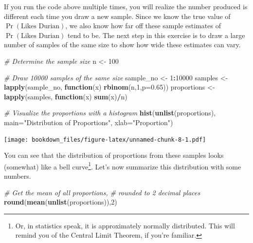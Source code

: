 \documentclass[openany]{book}
\newenvironment{Shaded}{\begin{snugshade}}{\end{snugshade}}
\newcommand{\KeywordTok}[1]{\textcolor[rgb]{0.13,0.29,0.53}{\textbf{#1}}}
\newcommand{\DataTypeTok}[1]{\textcolor[rgb]{0.13,0.29,0.53}{#1}}
\newcommand{\DecValTok}[1]{\textcolor[rgb]{0.00,0.00,0.81}{#1}}
\newcommand{\FloatTok}[1]{\textcolor[rgb]{0.00,0.00,0.81}{#1}}
\newcommand{\StringTok}[1]{\textcolor[rgb]{0.31,0.60,0.02}{#1}}
\newcommand{\CommentTok}[1]{\textcolor[rgb]{0.56,0.35,0.01}{\textit{#1}}}
\newcommand{\ControlFlowTok}[1]{\textcolor[rgb]{0.13,0.29,0.53}{\textbf{#1}}}
\newcommand{\OperatorTok}[1]{\textcolor[rgb]{0.81,0.36,0.00}{\textbf{#1}}}
\newcommand{\NormalTok}[1]{#1}
\let\rmarkdownfootnote\footnote%
\def\footnote{\protect\rmarkdownfootnote}
\begin{document}
If you run the code above multiple times, you will realize the number
produced is different each time you draw a new sample. Since we know the
true value of \(\Pr(\text{Likes Durian})\), we also know how far off
these sample estimates of \(\Pr(\text{Likes Durian})\) tend to be. The
next step in this exercise is to draw a large number of samples of the
same size to show how wide these estimates can vary.

\begin{Shaded}
\begin{Highlighting}[]
\CommentTok{# Determine the sample size}
\NormalTok{n <-}\StringTok{ }\DecValTok{100}

\CommentTok{# Draw 10000 samples of the same size}
\NormalTok{sample_no <-}\StringTok{ }\DecValTok{1}\OperatorTok{:}\DecValTok{10000}
\NormalTok{samples <-}\StringTok{ }\KeywordTok{lapply}\NormalTok{(sample_no, }\ControlFlowTok{function}\NormalTok{(x) }\KeywordTok{rbinom}\NormalTok{(n,}\DecValTok{1}\NormalTok{,}\DataTypeTok{p=}\FloatTok{0.65}\NormalTok{))}
\NormalTok{proportions <-}\StringTok{ }\KeywordTok{lapply}\NormalTok{(samples, }\ControlFlowTok{function}\NormalTok{(x) }\KeywordTok{sum}\NormalTok{(x)}\OperatorTok{/}\NormalTok{n)}

\CommentTok{# Visualize the proportions with a histogram}
\KeywordTok{hist}\NormalTok{(}\KeywordTok{unlist}\NormalTok{(proportions), }
     \DataTypeTok{main=}\StringTok{"Distribution of Proportions"}\NormalTok{, }
     \DataTypeTok{xlab=}\StringTok{"Proportion"}\NormalTok{)}
\end{Highlighting}
\end{Shaded}

\texttt{[image: bookdown\_files/figure-latex/unnamed-chunk-8-1.pdf]}

You can see that the distribution of proportions from these samples
looks (somewhat) like a bell curve\footnote{Or, in statistics speak, it
  is approximately normally distributed. This will remind you of the
  Central Limit Theorem, if you're familiar.}. Let's now summarize this
distribution with some numbers.

\begin{Shaded}
\begin{Highlighting}[]
\CommentTok{# Get the mean of all proportions, }
\CommentTok{#  rounded to 2 decimal places}
\KeywordTok{round}\NormalTok{(}\KeywordTok{mean}\NormalTok{(}\KeywordTok{unlist}\NormalTok{(proportions)),}\DecValTok{2}\NormalTok{)}
\end{Highlighting}
\end{Shaded}
\end{document}

